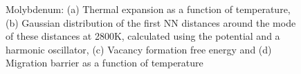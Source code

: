 \documentclass{article}
\begin{document}
\begin{figure}[!htp]
\centering
{}
\hfill
{}
\hfill
\caption{Molybdenum: (a) Thermal expansion as a function of temperature, (b) Gaussian distribution of the first NN distances around the mode of these distances at 2800K, calculated using the potential \cite{Zhou2004} and a harmonic oscillator, (c) Vacancy formation free energy and (d) Migration barrier as a function of temperature}
\label{fig:17}
\end{figure}
\end{document}
